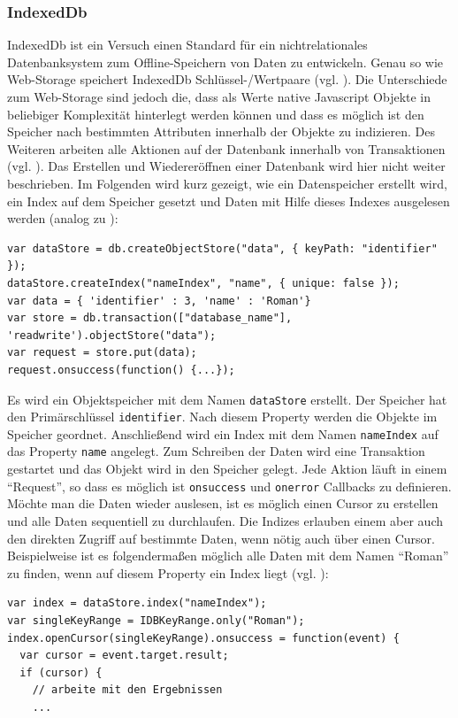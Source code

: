 \subsubsection*{IndexedDb}
IndexedDb ist ein Versuch einen Standard für ein nichtrelationales Datenbanksystem zum Offline-Speichern von Daten zu entwickeln. Genau so wie Web-Storage speichert IndexedDb Schlüssel-/Wertpaare (vgl. \cite{Mehta2012}). Die Unterschiede zum Web-Storage sind jedoch die, dass als Werte native Javascript Objekte in beliebiger Komplexität hinterlegt werden können und dass es möglich ist den Speicher nach bestimmten Attributen innerhalb der Objekte zu indizieren. Des Weiteren arbeiten alle Aktionen auf der Datenbank innerhalb von Transaktionen (vgl. \cite{MDN2011}). Das Erstellen und Wiedereröffnen einer Datenbank wird hier nicht weiter beschrieben. Im Folgenden wird kurz gezeigt, wie ein Datenspeicher erstellt wird, ein Index auf dem Speicher gesetzt und Daten mit Hilfe dieses Indexes ausgelesen werden (analog zu \cite{Mahemoff2010}):
\begin{lstlisting}
var dataStore = db.createObjectStore("data", { keyPath: "identifier" });
dataStore.createIndex("nameIndex", "name", { unique: false });
var data = { 'identifier' : 3, 'name' : 'Roman'}
var store = db.transaction(["database_name"], 'readwrite').objectStore("data");
var request = store.put(data);
request.onsuccess(function() {...});
\end{lstlisting}  
Es wird ein Objektspeicher mit dem Namen \texttt{dataStore} erstellt. Der Speicher hat den Primärschlüssel \texttt{identifier}. Nach diesem Property werden die Objekte im Speicher geordnet. Anschließend wird ein Index mit dem Namen \texttt{nameIndex} auf das Property \texttt{name} angelegt. Zum Schreiben der Daten wird eine Transaktion gestartet und das Objekt wird in den Speicher gelegt. Jede Aktion läuft in einem "`Request"', so dass es möglich ist \texttt{onsuccess} und \texttt{onerror} Callbacks zu definieren. Möchte man die Daten wieder auslesen, ist es möglich einen Cursor zu erstellen und alle Daten sequentiell zu durchlaufen. Die Indizes erlauben einem aber auch den direkten Zugriff auf bestimmte Daten, wenn nötig auch über einen Cursor.  Beispielweise ist es folgendermaßen möglich alle Daten mit dem Namen "`Roman"' zu finden, wenn auf diesem Property ein Index liegt (vgl. \cite{MDN2011}):
\begin{lstlisting}
var index = dataStore.index("nameIndex");
var singleKeyRange = IDBKeyRange.only("Roman");
index.openCursor(singleKeyRange).onsuccess = function(event) {
  var cursor = event.target.result;
  if (cursor) {
    // arbeite mit den Ergebnissen
    ...
\end{lstlisting} 

